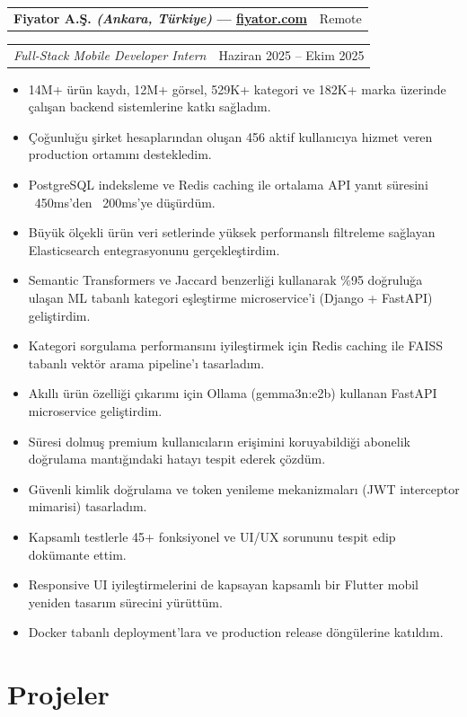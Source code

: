 \documentclass[10pt,a4paper]{extarticle}
\makeatletter
\newcommand{\entry}[2]{%
\noindent\begin{tabular*}{\textwidth}{@{\extracolsep{\fill}}lr}
\textbf{#1} & #2\\
\end{tabular*}
}
\newcommand{\subentry}[2]{%
\noindent\begin{tabular*}{\textwidth}{@{\extracolsep{\fill}}lr}
\textit{#1} & #2\\
\end{tabular*}
}
\makeatother
\begin{document}
\entry{Fiyator A.Ş. \textit{(Ankara, Türkiye)} \textnormal{---} \href{https://fiyator.com}{fiyator.com}}{Remote}
\subentry{Full-Stack Mobile Developer Intern}{Haziran 2025 -- Ekim 2025}
\begin{itemize}[leftmargin=*,noitemsep,topsep=0pt]
\item 14M+ ürün kaydı, 12M+ görsel, 529K+ kategori ve 182K+ marka üzerinde çalışan backend sistemlerine katkı sağladım.
\item Çoğunluğu şirket hesaplarından oluşan 456 aktif kullanıcıya hizmet veren production ortamını destekledim.
\item PostgreSQL indeksleme ve Redis caching ile ortalama API yanıt süresini ~450ms'den ~200ms'ye düşürdüm.
\item Büyük ölçekli ürün veri setlerinde yüksek performanslı filtreleme sağlayan Elasticsearch entegrasyonunu gerçekleştirdim.
\item Semantic Transformers ve Jaccard benzerliği kullanarak \%95 doğruluğa ulaşan ML tabanlı kategori eşleştirme microservice'i (Django + FastAPI) geliştirdim.
\item Kategori sorgulama performansını iyileştirmek için Redis caching ile FAISS tabanlı vektör arama pipeline'ı tasarladım.
\item Akıllı ürün özelliği çıkarımı için Ollama (gemma3n:e2b) kullanan FastAPI microservice geliştirdim.
\item Süresi dolmuş premium kullanıcıların erişimini koruyabildiği abonelik doğrulama mantığındaki hatayı tespit ederek çözdüm.
\item Güvenli kimlik doğrulama ve token yenileme mekanizmaları (JWT interceptor mimarisi) tasarladım.
\item Kapsamlı testlerle 45+ fonksiyonel ve UI/UX sorununu tespit edip dokümante ettim.
\item Responsive UI iyileştirmelerini de kapsayan kapsamlı bir Flutter mobil yeniden tasarım sürecini yürüttüm.
\item Docker tabanlı deployment'lara ve production release döngülerine katıldım.
\end{itemize}

\section{Projeler}
\end{document}
